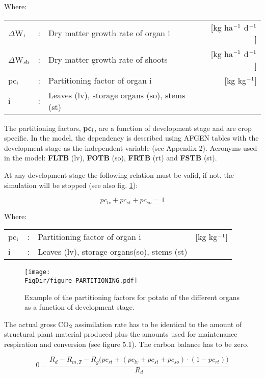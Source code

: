 Where:\\[5pt]
\begin{tabularx}{\textwidth}{llXr}
	$\Delta$W$_{{\rm i}}$ &:& Dry matter growth rate of organ i &
	[kg ha$^{{\rm -1}}$ d$^{{\rm -1}}$]\\
	$\Delta$W$_{{\rm sh}}$ &:& Dry matter growth rate of shoots   &
	[kg ha$^{{\rm -1}}$ d$^{{\rm -1}}$]\\
	pc$_{{\rm i}}$ &:& Partitioning factor of organ i    &
	[kg kg$^{{\rm -1}}$]\\
	i &:& Leaves (lv), storage organs (so), stems (st)
\end{tabularx}

The partitioning factors, {\bf pc$_{{\rm i}}$}, are a function of development stage and are crop specific. In the model, the dependency is described using AFGEN tables with the development stage as the independent variable (see Appendix 2). Acronyms used in the model: {\bf FLTB} (lv), {\bf FOTB} (so), {\bf FRTB} (rt) and {\bf FSTB} (st).

At any development stage the following relation must be valid, if not, the simulation will
be stopped (see also fig. \ref{fig:partitioning}):

\begin{equation}
pc_{lv} + pc_{st} + pc_{so} = 1
\end{equation}

Where:\\[5pt]
\begin{tabularx}{\textwidth}{llXr}
	pc$_{{\rm i}}$ &:& Partitioning factor of organ i   &
	[kg kg$^{{\rm -1}}$]\\
	i &:& Leaves (lv), storage organs(so), stems (st)
\end{tabularx}

\begin{figure}[p]
	\centering
	\texttt{[image: \\FigDir/figure\_PARTITIONING.pdf]}
	\caption{Example of the partitioning factors for potato of the different organs as a function of development stage.}
	\label{fig:partitioning}
\end{figure}

The actual gross CO$_{{\rm 2}}$ assimilation rate has to be identical to the amount of structural plant
material produced plus the amounts used for maintenance respiration and conversion (see
figure 5.1). The carbon balance has to be zero. 

\begin{equation}
\label{eq:5.47}
0 = {\frac{R_{d} - R_{m,T} - R_{g} \big( pc_{rt} + (pc_{lv} + pc_{st} + pc_{so}) \cdot (1 - pc_{rt}) \big) }{R_d}}  
\end{equation}

